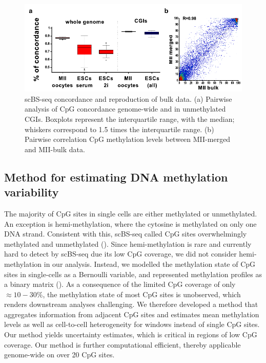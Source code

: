 \begin{figure}[htbp!]
\centering
\includegraphics[width=1.0\textwidth]{concord}
\caption[scBS-seq concordance and reproduction of bulk data.]{scBS-seq concordance and reproduction of bulk data. (a) Pairwise analysis of CpG concordance genome-wide and in unmethylated CGIs. Boxplots represent the interquartile range, with the median; whiskers correspond to 1.5 times the interquartile range. (b) Pairwise correlation CpG methylation levels between MII-merged and MII-bulk data.}
\label{fig:bs_concord}
\end{figure}


\subsection{Method for estimating DNA methylation variability} \label{sec:bs_method}

The majority of CpG sites in single cells are either methylated or unmethylated. An exception is hemi-methylation, where the cytosine is methylated on only one DNA strand. Consistent with this, scBS-seq called CpG sites overwhelmingly methylated and unmethylated (). Since hemi-methylation is rare and currently hard to detect by scBS-seq due its low CpG coverage, we did not consider hemi-methylation in our analysis. Instead, we modelled the methylation state of CpG sites in single-cells as a Bernoulli variable, and represented methylation profiles as a binary matrix (). As a consequence of the limited CpG coverage of only ${\approx}10-30\%$, the methylation state of most CpG sites is unobserved, which renders downstream analyses challenging. We therefore developed a method that aggregates information from adjacent CpG sites and estimates mean methylation levels as well as cell-to-cell heterogeneity for windows instead of single CpG sites. Our method yields uncertainty estimates, which is critical in regions of low CpG coverage. Our method is further computational efficient, thereby applicable genome-wide on over 20 CpG sites.

